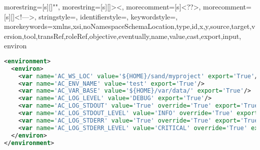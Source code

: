 \documentclass[design.tex]{subfiles}
\begin{document}


{
	morestring=[s][\color{mauve}]{"}{"},
	morestring=[s][\color{black}]{>}{<},
	morecomment=[s]{<?}{?>},
	morecomment=[s][\color{dkgreen}]{<!--}{-->},
	stringstyle=\color{black},
	identifierstyle=\color{DarkBlue},
	keywordstyle=\color{red},
	morekeywords={xmlns,xsi,noNamespaceSchemaLocation,type,id,x,y,source,target,version,tool,transRef,roleRef,objective,eventually,name,value,cast,export,input, environ}%
}
%

\begin{lstlisting}[language=XML, label=lst:project_env, caption=Example for project environment file]
<environment>
  <environ>
    <var name='AC_WS_LOC' value='${HOME}/sand/myproject' export='True'/>
    <var name='AC_ENV_NAME' value='test' export='True'/>
    <var name='AC_VAR_BASE' value='${HOME}/var/data/' export='True'/>
    <var name='AC_LOG_LEVEL' value='DEBUG' export='True'/> 
    <var name='AC_LOG_STDOUT' value='True' override='True' export='True' cast='boolean'/>
    <var name='AC_LOG_STDOUT_LEVEL' value='INFO' override='True' export='True'/>
    <var name='AC_LOG_STDERR' value='True' override='True' export='True' cast='boolean'/>
    <var name='AC_LOG_STDERR_LEVEL' value='CRITICAL' override='True' export='True'/>
  </environ>
</environment>
\end{lstlisting}
\end{document}
